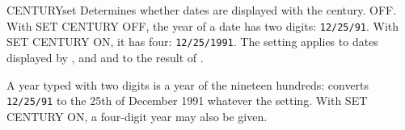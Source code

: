 \begin{XbaseEntry}{CENTURY}{set}
Determines whether dates are displayed with the century.
\Syntax
{}
\Defaults
OFF.
\Usage
With SET CENTURY OFF, the year of a date has two digits: \texttt{12/25/91}.
With SET CENTURY ON, it has four: \texttt{12/25/1991}.  The setting applies to
dates displayed by ,  and  and to the result of
.

A year typed with two digits is a year of the nineteen hundreds:
 converts \texttt{12/25/91} to the 25th of December 1991 whatever the
setting.  With SET CENTURY ON, a four-digit year may also be given.
\Examples
{}
\end{XbaseEntry}

